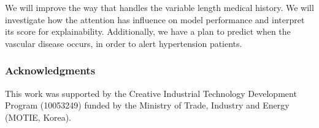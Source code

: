 \documentclass{article}
\begin{document}
We will improve the way that handles the variable length medical history. We will investigate how the attention has influence on model performance and interpret its score for explainability. Additionally, we have a plan to predict when the vascular disease occurs, in order to alert hypertension patients.






\subsubsection*{Acknowledgments}
This work was supported by the Creative Industrial Technology Development Program (10053249) funded by the Ministry of Trade, Industry and Energy (MOTIE, Korea).


\small


\end{document}
